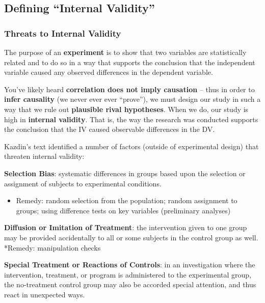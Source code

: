 \documentclass[
  english,
]{book}
\providecommand{\tightlist}{%
  \setlength{\itemsep}{0pt}\setlength{\parskip}{0pt}}
\begin{document}
\hypertarget{defining-internal-validity-1}{%
\subsection{Defining ``Internal Validity''}\label{defining-internal-validity-1}}

\hypertarget{threats-to-internal-validity-1}{%
\subsubsection{Threats to Internal Validity}\label{threats-to-internal-validity-1}}

The purpose of an \textbf{experiment} is to show that two variables are statistically related and to do so in a way that supports the conclusion that the independent variable caused any observed differences in the dependent variable.

You've likely heard \textbf{correlation does not imply causation} -- thus in order to \textbf{infer causality} (we never ever ever ``prove''), we must design our study in such a way that we rule out \textbf{plausible rival hypotheses}. When we do, our study is high in \textbf{internal validity}. That is, the way the research was conducted supports the conclusion that the IV caused observable differences in the DV.

Kazdin's \citeyearpar{kazdin_research_2017} text identified a number of factors (outside of experimental design) that threaten internal validity:

\textbf{Selection Bias}: systematic differences in groups based upon the selection or assignment of subjects to experimental conditions.

\begin{itemize}
\tightlist
\item
  Remedy: random selection from the population; random assignment to groups; using difference tests on key variables (preliminary analyses)
\end{itemize}

\textbf{Diffusion or Imitation of Treatment}: the intervention given to one group may be provided accidentally to all or some subjects in the control group as well.
*Remedy: manipulation checks

\textbf{Special Treatment or Reactions of Controls}: in an investigation where the intervention, treatment, or program is administered to the experimental group, the no-treatment control group may also be accorded special attention, and thus react in unexpected ways.
\end{document}
